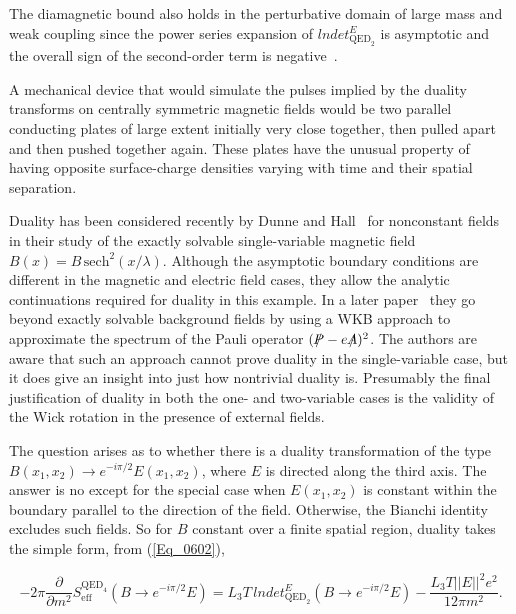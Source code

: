 \documentclass[a4paper,twocolumn,showpacs,preprintnumbers,amsmath,amssymb]{revtex4}
\newcommand{\pdo}[1]{\ensuremath{\frac{\partial }
        {\partial #1 }}}
\newcommand{\slashletter}[1]{\ensuremath{\kern+0.1em /\kern-0.65em #1}}
\begin{document}
The diamagnetic bound also holds in the perturbative domain of large
mass and weak coupling since the power series expansion of
$lndet^{E}_{\text{QED}_2}$ is asymptotic and the overall sign of the
second-order term is negative~\cite{Fry00a}.

A mechanical device that would simulate the pulses implied by the
duality transforms on centrally symmetric magnetic fields would be
two parallel conducting plates of large extent initially very close
together, then pulled apart and then pushed together again. These
plates have the unusual property of having opposite surface-charge
densities varying with time and their spatial separation.

Duality has been considered recently by Dunne and Hall~\cite{Dunne98}
for nonconstant fields in their study of the exactly solvable
single-variable magnetic field $B(x)=B \, \text{sech}^2(x/\lambda)$.
Although the asymptotic boundary conditions are different in the
magnetic and electric field cases, they allow the analytic
continuations required for duality in this example. In a later
paper~\cite{Dunne99} they go beyond exactly solvable background fields
by using a WKB approach to approximate the spectrum of the Pauli
operator $(\slashletter{P} - e\slashletter{A})^2$. The authors are
aware that such an approach cannot prove duality in the
single-variable case, but it does give an insight into just how
nontrivial duality is. Presumably the final justification of duality
in both the one- and two-variable cases is the validity of the Wick
rotation in the presence of external fields.

The question arises as to whether there is a duality transformation of
the type $B(x_1,x_2) \to e^{-i\pi/2} E(x_1, x_2)$, where $E$ is
directed along the third axis. The answer is no except for the special
case when $E(x_1 ,x_2)$ is constant within the boundary parallel to
the direction of the field. Otherwise, the Bianchi identity excludes
such fields. So for $B$ constant over a finite spatial region, duality
takes the simple form, from (\ref{Eq_0602}),

\begin{widetext}
\begin{equation}
\label{Eq_0613}
-2\pi \pdo{m^2} S^{\text{QED}_4}_{\text{eff}}
  (B \to e^{-i\pi/2} E)
  = L_3 T \, lndet^E_{\text{QED}_2} (B \to e^{-i\pi/2} E)
  - \frac{L_3 T ||E||^2 e^2}{12 \pi m^2}. 
\end{equation}
\end{widetext}
\end{document}
